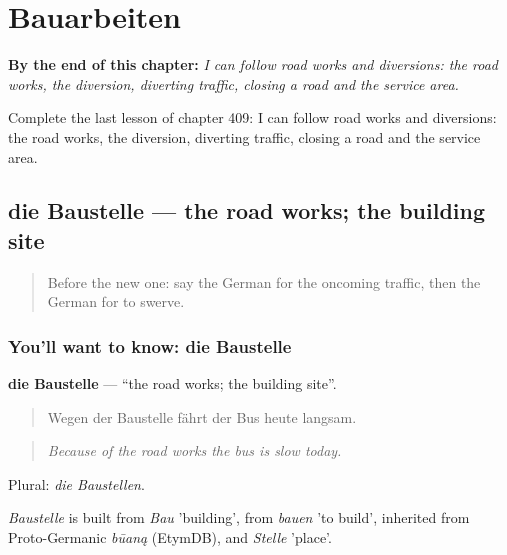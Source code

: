 
\chapter{Bauarbeiten}
\label{ch:ge-bauarbeiten}

\begin{chapteropening}
\textbf{By the end of this chapter:} \emph{I can follow road works and diversions: the road works, the diversion, diverting traffic, closing a road and the service area.}

Complete the last lesson of chapter 409: I can follow road works and diversions: the road works, the diversion, diverting traffic, closing a road and the service area.
\end{chapteropening}

\section[die Baustelle]{die Baustelle — the road works; the building site}

\label{lesson:GE-C409-baustelle}



\begin{quote}
Before the new one: say the German for the oncoming traffic, then the German for to swerve.
\end{quote}

\subsection*{You'll want to know: die Baustelle}
\textbf{die Baustelle} — \textquotedblleft{}the road works; the building site\textquotedblright{}.

\begin{quote}
Wegen der Baustelle fährt der Bus heute langsam.
\end{quote}

\begin{quote}
\emph{Because of the road works the bus is slow today.}
\end{quote}

Plural: \emph{die Baustellen}.

\begin{cousinweb}
\emph{Baustelle} is built from \emph{Bau} 'building', from \emph{bauen} 'to build', inherited from Proto-Germanic \emph{būaną} (EtymDB), and \emph{Stelle} 'place'.
\end{cousinweb}

